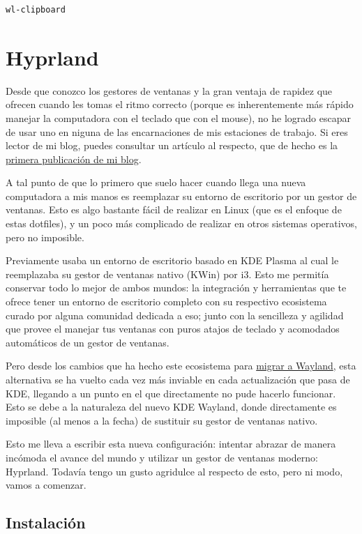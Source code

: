 \documentclass[11pt]{article}
\begin{document}
\begin{verbatim}
wl-clipboard
\end{verbatim}
\section{Hyprland}
\label{sec:org2baa6f9}

Desde que conozco los gestores de ventanas y la gran ventaja de rapidez que ofrecen cuando les tomas el ritmo correcto (porque es inherentemente más rápido manejar la computadora con el teclado que con el mouse), no he logrado escapar de usar uno en niguna de las encarnaciones de mis estaciones de trabajo. Si eres lector de mi blog, puedes consultar un artículo al respecto, que de hecho es la \href{https://blog.mrtaichi.dev/blogs/2025-01-14-gestordeventanas/}{primera publicación de mi blog}.

A tal punto de que lo primero que suelo hacer cuando llega una nueva computadora a mis manos es reemplazar su entorno de escritorio por un gestor de ventanas. Esto es algo bastante fácil de realizar en Linux (que es el enfoque de estas dotfiles), y un poco más complicado de realizar en otros sistemas operativos, pero no imposible.

Previamente usaba un entorno de escritorio basado en KDE Plasma al cual le reemplazaba su gestor de ventanas nativo (KWin) por i3. Esto me permitía conservar todo lo mejor de ambos mundos: la integración y herramientas que te ofrece tener un entorno de escritorio completo con su respectivo ecosistema curado por alguna comunidad dedicada a eso; junto con la sencilleza y agilidad que provee el manejar tus ventanas con puros atajos de teclado y acomodados automáticos de un gestor de ventanas.

Pero desde los cambios que ha hecho este ecosistema para \href{https://blogs.kde.org/2025/11/26/going-all-in-on-a-wayland-future/}{migrar a Wayland}, esta alternativa se ha vuelto cada vez más inviable en cada actualización que pasa de KDE, llegando a un punto en el que directamente no pude hacerlo funcionar. Esto se debe a la naturaleza del nuevo KDE Wayland, donde directamente es imposible (al menos a la fecha) de sustituir su gestor de ventanas nativo.

Esto me lleva a escribir esta nueva configuración: intentar abrazar de manera incómoda el avance del mundo y utilizar un gestor de ventanas moderno: Hyprland. Todavía tengo un gusto agridulce al respecto de esto, pero ni modo, vamos a comenzar.
\subsection{Instalación}
\label{sec:orgd0c6fea}
\end{document}
